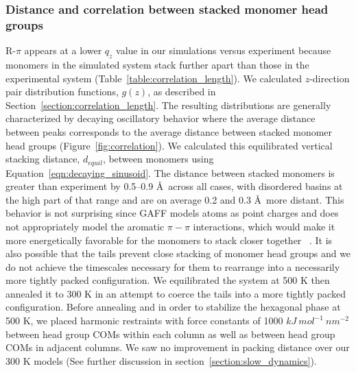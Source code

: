 \documentclass[journal=jpcbfk,manuscript=article]{achemso}
\begin{document}

  \subsubsection*{Distance and correlation between stacked monomer head groups}

  R-$\pi$ appears at a lower $q_z$ value in our simulations versus experiment because
  monomers in the simulated system stack further apart than those in the experimental
  system (Table~\ref{table:correlation_length}). We calculated $z$-direction pair distribution
  functions, $g(z)$, as described in Section~\ref{section:correlation_length}.
  The resulting distributions are generally characterized by decaying
  oscillatory behavior where the average distance between peaks corresponds to
  the average distance between stacked monomer head groups
  (Figure~\ref{fig:correlation}).  We calculated this equilibrated vertical
  stacking distance, $\mathit{d}_{equil}$, between monomers using
  Equation~\ref{eqn:decaying_sinusoid}. The distance between stacked monomers is
  greater than experiment by 0.5--0.9 \AA~across all cases, with disordered
  basins at the high part of that range and are on average 0.2 and 0.3 \AA~more
  distant. This behavior is not surprising since GAFF models atoms as point charges and
  does not appropriately model the aromatic $\pi-\pi$ interactions, which would make
  it more energetically favorable for the monomers to stack closer together ~\cite{wang_development_2004}.
  It is also possible that the tails prevent close stacking of monomer head groups
  and we do not achieve the timescales necessary for them to rearrange into a
  necessarily more tightly packed configuration. We equilibrated the
  system at 500 K then annealed it to 300 K in an attempt to coerce the tails
  into a more tightly packed configuration. Before annealing and in order to
  stabilize the hexagonal phase at 500 K, we placed harmonic restraints with 
  force constants of 1000 $kJ\ mol^{-1}\ nm^{-2}$ between head group COMs
  within each column as well as between head group COMs in
  adjacent columns. We saw no improvement in packing distance over our 300 K
  models (See further discussion in section~\ref{section:slow_dynamics}). 
  
\end{document}
